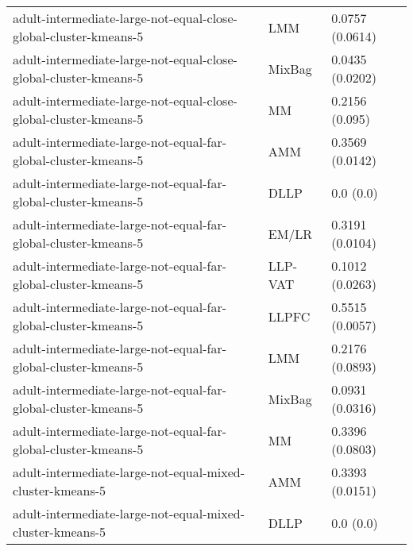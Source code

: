 \begin{longtable}{lll}
                                             adult-intermediate-large-not-equal-close-global-cluster-kmeans-5 &       LMM &                           0.0757 (0.0614) \\
                                             adult-intermediate-large-not-equal-close-global-cluster-kmeans-5 &    MixBag &                           0.0435 (0.0202) \\
                                             adult-intermediate-large-not-equal-close-global-cluster-kmeans-5 &        MM &                            0.2156 (0.095) \\
                                               adult-intermediate-large-not-equal-far-global-cluster-kmeans-5 &       AMM &                           0.3569 (0.0142) \\
                                               adult-intermediate-large-not-equal-far-global-cluster-kmeans-5 &      DLLP &                                 0.0 (0.0) \\
                                               adult-intermediate-large-not-equal-far-global-cluster-kmeans-5 &     EM/LR &                           0.3191 (0.0104) \\
                                               adult-intermediate-large-not-equal-far-global-cluster-kmeans-5 &   LLP-VAT &                           0.1012 (0.0263) \\
                                               adult-intermediate-large-not-equal-far-global-cluster-kmeans-5 &     LLPFC &                           0.5515 (0.0057) \\
                                               adult-intermediate-large-not-equal-far-global-cluster-kmeans-5 &       LMM &                           0.2176 (0.0893) \\
                                               adult-intermediate-large-not-equal-far-global-cluster-kmeans-5 &    MixBag &                           0.0931 (0.0316) \\
                                               adult-intermediate-large-not-equal-far-global-cluster-kmeans-5 &        MM &                           0.3396 (0.0803) \\
                                                    adult-intermediate-large-not-equal-mixed-cluster-kmeans-5 &       AMM &                           0.3393 (0.0151) \\
                                                    adult-intermediate-large-not-equal-mixed-cluster-kmeans-5 &      DLLP &                                 0.0 (0.0) \\

\end{longtable}
